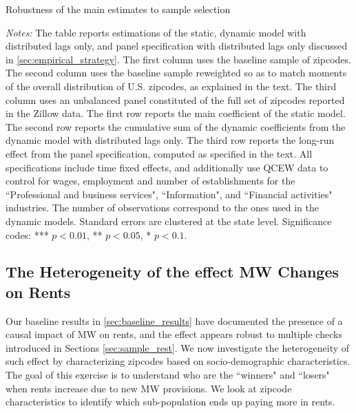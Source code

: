 \begin{table}[h!]\centering
	\caption{Robustness of the main estimates to sample selection}  %
	\label{tab:wgt_unbal_comparison}
	
	\begin{minipage}{0.95\textwidth}\footnotesize
	\vspace{3mm}	
	\textit{Notes:} The table reports estimations of the static, dynamic model with distributed
	lags only, and panel specification with distributed lags only discussed in 
	\autoref{sec:empirical_strategy}. The first column uses the baseline sample of zipcodes. The 
	second column uses the baseline sample reweighted so as to match moments of the overall 
	distribution of U.S. zipcodes, as explained in the text. The third column uses an unbalanced
	panel constituted of the full set of zipcodes reported in the Zillow data. The first row 
	reports the main coefficient of the static model. The second row reports the cumulative sum
	of the dynamic coefficients from the dynamic model with distributed lags only. The third row
	reports the long-run effect from the panel specification, computed as specified in the text. 
	All specifications include time fixed effects, and additionally use QCEW data to control for 
	wages, employment and number of establishments for the ``Professional and business services", 
	``Information", and ``Financial activities" industries. The number of observations correspond
	to the ones used in the dynamic models. Standard errors are clustered at the state level. 
	Significance codes: *** $p < 0.01$, ** $p < 0.05$, * $p < 0.1$.	
	\end{minipage}
\end{table}



\subsection{The Heterogeneity of the effect MW Changes on Rents}\label{sec:heter}

Our baseline results in \autoref{sec:baseline_results} have documented the presence of a causal 
impact of MW on rents, and the effect appears robust to multiple checks introduced in Sections 
\ref{sec:sample_rest}. We now investigate the heterogeneity of such effect 
by characterizing zipcodes based on socio-demographic characteristics. The goal of this exercise is 
to understand who are the ``winners" and ``losers" when rents increase 
due to new MW provisions. We look at zipcode characteristics to identify which sub-population ends 
up paying more in rents.

